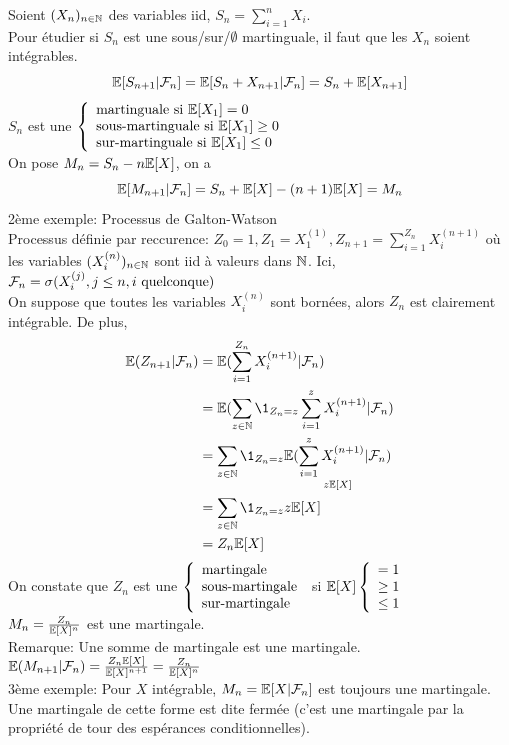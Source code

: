 \documentclass[]{report}
\begin{document}
    \begin{ex}{}{}
        Soient $(X_n)_{n\in\mathbb{N}}$ des variables iid, $S_n=\sum_{i=1}^{n}X_i$.\\
        Pour étudier si $S_n$ est une sous/sur/$\emptyset$ martinguale, il faut que les $X_n$ soient intégrables.
        \[\mathbb{E}[S_{n+1}|\mathcal{F}_n]=\mathbb{E}[S_n+X_{n+1}|\mathcal{F}_n]=S_n+\mathbb{E}[X_{n+1}]\]
        $S_n$ est une $\left\{\begin{array}{ll} \text{martinguale si }\mathbb{E}[X_1]=0\\ \text{sous-martinguale si }\mathbb{E}[X_1]\ge 0\\ \text{sur-martinguale si }\mathbb{E}[X_1]\le 0  \end{array} \right.$\\
        On pose $M_n=S_n-n\mathbb{E}[X]$, on a
        \[\mathbb{E}[M_{n+1}|\mathcal{F}_n]=S_n+\mathbb{E}[X]-(n+1)\mathbb{E}[X]=M_n\]
        2ème exemple: Processus de Galton-Watson\\
        Processus définie par reccurence: $Z_0=1, Z_1=X_1^{(1)}, Z_{n+1}=\sum_{i=1}^{Z_n}X_i^{(n+1)}$ où les variables $(X_i^{(n)})_{n\in\mathbb{N}}$ sont iid à valeurs dans $\mathbb{N}$. Ici, $\mathcal{F}_n=\sigma(X_i^{(j)},j\le n,i\text{ quelconque})$\\
        On suppose que toutes les variables $X_i^{(n)}$ sont bornées, alors $Z_n$ est clairement intégrable. De plus,
        \begin{align*}
            \Ea(Z_{n+1}|\Fr_n)&=\Ea(\sum_{i=1}^{Z_n}X_{i}^{(n+1)}|\Fr_n)\\
            &=\Ea(\sum_{z\in \N}\1_{Z_n=z}\sum_{i=1}^{z}X_i^{(n+1)}|\Fr_n)\\
            &=\sum_{z\in \N}\1_{Z_n=z}\underset{z\Ea[X]}{\Ea(\sum_{i=1}^{z}X_i^{(n+1)}|\Fr_n)}\\
            &=\sum_{z\in \N}\1_{Z_n=z} z\Ea[X]\\
            &=Z_n\Ea[X]
        \end{align*}
        On constate que $Z_n$ est une $\left\{\begin{array}{ll} \text{martingale}\\\text{sous-martingale} \\ \text{\text{sur-martingale}} \end{array} \right.$ si $\mathbb{E}[X]\left\{\begin{array}{ll} =1\\ \ge 1\\ \le 1 \end{array} \right.$\\
        $M_n=\frac{Z_n}{\mathbb{E}[X]^n}$ est une martingale.\\
        Remarque: Une somme de martingale est une martingale.\\
        $\mathbb{E}(M_{n+1}|\mathcal{F}_n)=\frac{Z_n\mathbb{E}[X]}{\mathbb{E}[X]^{n+1}}=\frac{Z_n}{\mathbb{E}[X]^{n}}$\\
        3ème exemple: Pour $X$ intégrable, $M_n=\mathbb{E}[X|\mathcal{F}_n]$ est toujours une martingale. Une martingale de cette forme est dite fermée (c'est une martingale par la propriété de tour des espérances conditionnelles).
    \end{ex}
\end{document}
